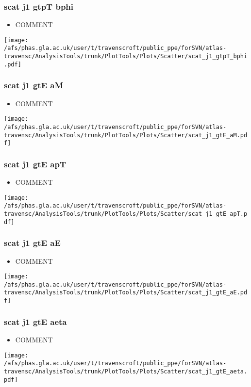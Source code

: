 \documentclass{beamer}
\begin{document}
\begin{frame}
\frametitle{scat j1 gtpT bphi}
\begin{itemize}
\item COMMENT
\end{itemize}
\begin{center}
\texttt{[image: /afs/phas.gla.ac.uk/user/t/travenscroft/public\_ppe/forSVN/atlas-travensc/AnalysisTools/trunk/PlotTools/Plots/Scatter/scat\_j1\_gtpT\_bphi.pdf]}
\end{center}
\end{frame}

\begin{frame}
\frametitle{scat j1 gtE aM}
\begin{itemize}
\item COMMENT
\end{itemize}
\begin{center}
\texttt{[image: /afs/phas.gla.ac.uk/user/t/travenscroft/public\_ppe/forSVN/atlas-travensc/AnalysisTools/trunk/PlotTools/Plots/Scatter/scat\_j1\_gtE\_aM.pdf]}
\end{center}
\end{frame}

\begin{frame}
\frametitle{scat j1 gtE apT}
\begin{itemize}
\item COMMENT
\end{itemize}
\begin{center}
\texttt{[image: /afs/phas.gla.ac.uk/user/t/travenscroft/public\_ppe/forSVN/atlas-travensc/AnalysisTools/trunk/PlotTools/Plots/Scatter/scat\_j1\_gtE\_apT.pdf]}
\end{center}
\end{frame}

\begin{frame}
\frametitle{scat j1 gtE aE}
\begin{itemize}
\item COMMENT
\end{itemize}
\begin{center}
\texttt{[image: /afs/phas.gla.ac.uk/user/t/travenscroft/public\_ppe/forSVN/atlas-travensc/AnalysisTools/trunk/PlotTools/Plots/Scatter/scat\_j1\_gtE\_aE.pdf]}
\end{center}
\end{frame}

\begin{frame}
\frametitle{scat j1 gtE aeta}
\begin{itemize}
\item COMMENT
\end{itemize}
\begin{center}
\texttt{[image: /afs/phas.gla.ac.uk/user/t/travenscroft/public\_ppe/forSVN/atlas-travensc/AnalysisTools/trunk/PlotTools/Plots/Scatter/scat\_j1\_gtE\_aeta.pdf]}
\end{center}
\end{frame}
\end{document}

